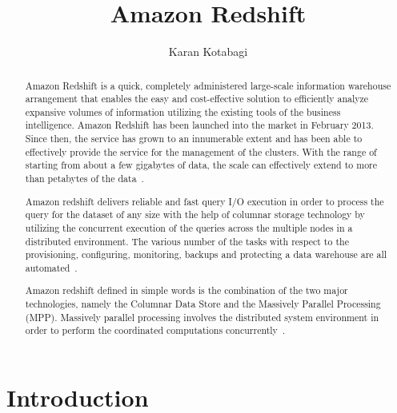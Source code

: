 
\title{Amazon Redshift}

\author{Karan Kotabagi}

\begin{abstract}
	Amazon Redshift is a quick, completely administered large-scale 
	information warehouse arrangement that enables the easy and 
	cost-effective solution to efficiently analyze expansive volumes 
	of information utilizing the existing tools of the business 
	intelligence. Amazon Redshift has been launched into the market in 
	February 2013. Since then, the service has grown to an innumerable 
	extent and has been able to effectively provide the service for the 
	management of the clusters. With the range of starting from about a 
	few gigabytes of data, the scale can effectively extend to more 
	than petabytes of the 
	data~\cite{hid-sp18-412-hid-sp18-412_Gupta_2015_ARC}.
    
	Amazon redshift delivers reliable and fast query I/O execution in order 
	to process the query for the dataset of any size with the help of 
	columnar storage technology by utilizing the concurrent execution 
	of the queries across the multiple nodes in a distributed environment. 
	The various number of the tasks with respect to the provisioning, 
	configuring, monitoring, backups and protecting a 
	data warehouse are all automated~\cite{hid-sp18-412-Aws_Tech_Target}. 
	
	Amazon redshift defined in simple words is the combination of the 
	two major technologies, namely the Columnar Data Store and the 
	Massively Parallel Processing (MPP). Massively parallel processing 
	involves the distributed system environment in order to perform the 
	coordinated computations 
	concurrently~\cite{hid-sp18-412-what-is-amazon-redshift-aws}.

\end{abstract}


\maketitle

\section{Introduction}

